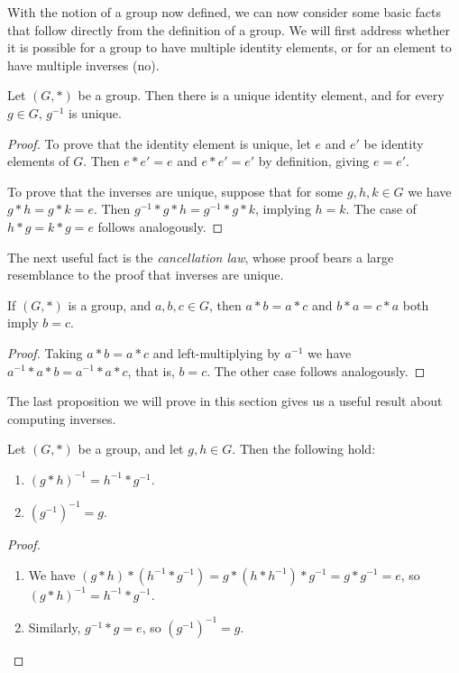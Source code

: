 
With the notion of a group now defined, we can now consider some basic facts that follow directly from the definition of a group. We will first address whether it is possible for a group to have multiple identity elements, or for an element to have multiple inverses (no).

\begin{proposition}
	Let $(G, *)$ be a group. Then there is a unique identity element, and for every $g \in G$, $g^{-1}$ is unique.
\end{proposition}
\begin{proof}
	To prove that the identity element is unique, let $e$ and $e'$ be identity elements of $G$. Then $e* e' = e$ and $e* e' = e'$ by definition, giving $e = e'$. 
	
	To prove that the inverses are unique, suppose that for some $g, h, k \in G$ we have $g* h = g *k = e$. Then $g^{-1}* g *h = g^{-1} *g * k$, implying $h = k$. The case of $h * g = k * g = e$ follows analogously.
\end{proof}

The next useful fact is the \emph{cancellation law}, whose proof bears a large resemblance to the proof that inverses are unique.

\begin{proposition}
	If $(G, *)$ is a group, and $a, b, c \in G$, then $a*b = a*c$ and $b*a = c*a$ both imply $b = c$.
\end{proposition}
\begin{proof}
	Taking $a * b = a * c$ and left-multiplying by $a^{-1}$ we have $a^{-1} * a * b = a^{-1} * a * c$, that is, $b = c$. The other case follows analogously.
\end{proof}

The last proposition we will prove in this section gives us a useful result about computing inverses.

\begin{proposition}
	Let $(G, *)$ be a group, and let $g, h \in G$. Then the following hold:
	\begin{enumerate}[label=(\roman*)]
		\item $(g*h)^{-1} = h^{-1} * g^{-1}$.
		\item $(g^{-1})^{-1} = g$.
	\end{enumerate}
\end{proposition}
\begin{proof}$ $\phantom{\qedhere}
	\begin{enumerate}[label=(\roman*)]
		\item We have $(g*h) * (h^{-1} * g^{-1}) =  g * (h * h^{-1}) * g^{-1} = g * g^{-1} = e$, so $(g*h)^{-1} = h^{-1} * g^{-1}$.
		\item Similarly, $g^{-1} * g = e$, so $(g^{-1})^{-1} = g$. \hfill \qedsymbol
	\end{enumerate}
\end{proof}

